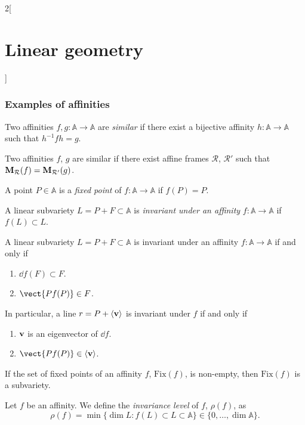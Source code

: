 \documentclass[../../../main.tex]{subfiles}
\begin{document}
\begin{multicols}{2}[\section{Linear geometry}]
  \subsubsection{Examples of affinities}
  \begin{definition}
    Two affinities $f,g:\mathbb{A}\rightarrow\mathbb{A}$ are \emph{similar} if there exist a bijective affinity $h:\mathbb{A}\rightarrow\mathbb{A}$ such that $h^{-1}fh=g$.
  \end{definition}
  \begin{proposition}
    Two affinities $f$, $g$ are similar if there exist affine frames $\mathcal{R}$, $\mathcal{R}'$ such that $\boldsymbol{\mathrm{M}}_\mathcal{R}(f)=\boldsymbol{\mathrm{M}}_{\mathcal{R}'}(g)$.
  \end{proposition}
  \begin{definition}
    A point $P\in\mathbb{A}$ is a \emph{fixed point} of $f:\mathbb{A}\rightarrow\mathbb{A}$ if $f(P)=P$.
  \end{definition}
  \begin{definition}
    A linear subvariety $L=P+F\subset\mathbb{A}$ is \emph{invariant under an affinity} $f:\mathbb{A}\rightarrow\mathbb{A}$ if $f(L)\subset L$.
  \end{definition}
  \begin{proposition}
    A linear subvariety $L=P+F\subset\mathbb{A}$ is invariant under an affinity $f:\mathbb{A}\rightarrow\mathbb{A}$ if and only if
    \begin{enumerate}
      \item $\dd{f(F)}\subset F$.
      \item $\vect{Pf(P)}\in F$.
    \end{enumerate} In particular, a line $r=P+\langle\boldsymbol{\mathrm{v}}\rangle$ is invariant under $f$ if and only if
    \begin{enumerate}
      \item $\boldsymbol{\mathrm{v}}$ is an eigenvector of $\dd{f}$.
      \item $\vect{Pf(P)}\in\langle\vf{v}\rangle$.
    \end{enumerate}
  \end{proposition}
  \begin{proposition}
    If the set of fixed points of an affinity $f$, $\text{Fix}(f)$, is non-empty, then $\text{Fix}(f)$ is a subvariety.
  \end{proposition}
  \begin{definition}
    Let $f$ be an affinity. We define the \emph{invariance level} of $f$, $\rho(f)$, as $$\rho(f)=\min\{\dim L:f(L)\subset L\subset\mathbb{A}\}\in\{0,\ldots,\dim\mathbb{A}\}.$$

\end{definition}
\end{multicols}
\end{document}
